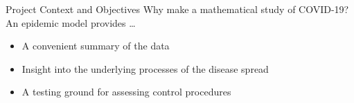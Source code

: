 \begin{slide}{Project Context and Objectives}
	{\large Why make a mathematical study of COVID-19?} \\
	\vspace{1cm}
	An epidemic model provides \dots
	\begin{itemize}
		\item A convenient summary of the data
		\item Insight into the underlying processes of the disease spread
		\item A testing ground for assessing control procedures
	\end{itemize}
\end{slide}